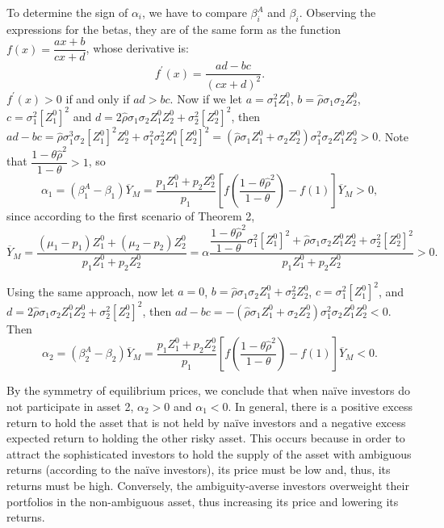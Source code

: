 \documentclass[10pt]{article}
\begin{document}
To determine the sign of $ \alpha_i $, we have to compare $ \beta_i^A $ and $ \beta_i $. Observing the expressions for the betas, they are of the same form as the function $ f (x) = \dfrac{a x + b}{c x + d} $, whose derivative is:
\begin{equation*}
f^{\prime} (x) = \dfrac{a d - b c}{(c x + d)^2}.
\end{equation*}
$ f^{\prime} (x) > 0 $ if and only if $ a d > b c $. Now if we let $ a = \sigma_1^2 Z_1^0 $, $ b = \hat{\rho} \sigma_1 \sigma_2 Z_2^0 $, $ c = \sigma_1^2 \left[ Z_1^0 \right]^2 $ and $ d = 2 \hat{\rho} \sigma_1 \sigma_2 Z_1^0 Z_2^0 + \sigma_2^2 \left[ Z_2^0 \right]^2 $, then $ a d - b c = \hat{\rho} \sigma_1^3 \sigma_2 \left[ Z_1^0 \right]^2 Z_2^0 + \sigma_1^2 \sigma_2^2 Z_1^0 \left[ Z_2^0 \right]^2 = (\hat{\rho} \sigma_1 Z_1^0 + \sigma_2 Z_2^0) \sigma_1^2 \sigma_2 Z_1^0 Z_2^0 > 0 $. Note that $ \dfrac{1 - \theta\hat{\rho}^2}{1 - \theta} > 1 $, so 
\begin{equation*}
\alpha_1 = (\beta_1^A - \beta_1) \overline{Y}_M = \dfrac{p_1 Z_1^0 + p_2 Z_2^0}{p_1} \left[ f \left( \dfrac{1 - \theta\hat{\rho}^2}{1 - \theta} \right) - f (1) \right] \overline{Y}_M > 0,
\end{equation*} 
since according to the first scenario of Theorem 2,
\begin{equation*}
\overline{Y}_M = \dfrac{(\mu_1 - p_1) Z_1^0 + (\mu_2 - p_2) Z_2^0}{p_1 Z_1^0 + p_2 Z_2^0} = \alpha\dfrac{\dfrac{1 - \theta\hat{\rho}^2}{1 - \theta} \sigma_1^2 \left[ Z_1^0 \right]^2 + \hat{\rho} \sigma_1 \sigma_2 Z_1^0 Z_2^0 + \sigma_2^2 \left[ Z_2^0 \right]^2}{p_1 Z_1^0 + p_2 Z_2^0} > 0.
\end{equation*}

Using the same approach, now let $ a = 0 $, $ b = \hat{\rho} \sigma_1 \sigma_2 Z_1^0 + \sigma_2^2 Z_2^0 $, $ c = \sigma_1^2 \left[ Z_1^0 \right]^2 $, and $ d = 2 \hat{\rho} \sigma_1 \sigma_2 Z_1^0 Z_2^0 + \sigma_2^2 \left[ Z_2^0 \right]^2 $, then $ a d - b c = - (\hat{\rho} \sigma_1 Z_1^0 + \sigma_2 Z_2^0) \sigma_1^2 \sigma_2 Z_1^0 Z_2^0 < 0 $. Then
\begin{equation*}
\alpha_2 = (\beta_2^A - \beta_2) \overline{Y}_M = \dfrac{p_1 Z_1^0 + p_2 Z_2^0}{p_1} \left[ f \left( \dfrac{1 - \theta \hat{\rho}^2}{1 - \theta} \right) - f (1) \right] \overline{Y}_M < 0. 
\end{equation*}

By the symmetry of equilibrium prices, we conclude that when na\"ive investors do not participate in asset 2, $\alpha_2 > 0 $ and $ \alpha_1 < 0 $. In general, there is a positive excess return to hold the asset that is not held by na\"ive investors and a negative excess expected return to holding the other risky asset. This occurs because in order to attract the sophisticated investors to hold the supply of the asset with ambiguous returns (according to the na\"ive investors), its price must be low and, thus, its returns must be high. Conversely, the ambiguity-averse investors overweight their portfolios in the non-ambiguous asset, thus increasing its price and lowering its returns.
\end{document}
